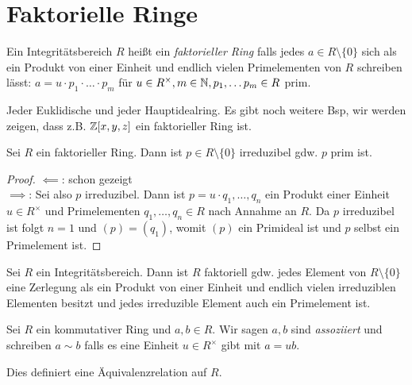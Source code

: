 \section{Faktorielle Ringe}

\begin{definition}
	Ein Integritätsbereich $R$ heißt ein \emph{faktorieller Ring} falls jedes $a \in R \setminus \{0\}$ sich als ein Produkt von einer Einheit
	und endlich vielen Primelementen von $R$ schreiben lässt: $a = u \cdot  p_1 \cdot \ldots \cdot p_{m}$ für $u \in R^{\times}, m \in \mathbb{N}, p_1,\ldots p_{m} \in R$ prim.
\end{definition}

\begin{eg}
	Jeder Euklidische und jeder Hauptidealring.
	Es gibt noch weitere Bsp, wir werden zeigen, dass z.B. $\mathbb{Z}[x,y,z]$ ein faktorieller Ring ist.
\end{eg}

\begin{proposition}
	Sei $R$ ein faktorieller Ring.
	Dann ist $p \in R \setminus \{0\} $ irreduzibel gdw. $p$ prim ist.
\end{proposition}

\begin{proof}
	$\impliedby$: \checkmark schon gezeigt\\
	$\implies$: Sei also $p$ irreduzibel. Dann ist $p = u \cdot  q_1,\ldots,q_{n}$ ein Produkt einer Einheit
	$u \in R^{\times}$ und Primelementen $q_1,\ldots, q_{n} \in R$ nach Annahme an $R$.
	Da $p$ irreduzibel ist folgt $n =1$ und $(p) = (q_1)$, womit $(p)$ ein Primideal ist und $p$ selbst ein Primelement ist.
\end{proof} 

\begin{corollary}
	Sei $R$ ein Integritätsbereich. Dann ist $R$ faktoriell gdw. jedes Element von $R \setminus \{0\} $ eine Zerlegung als ein Produkt
	von einer Einheit und endlich vielen irreduziblen Elementen besitzt und jedes irreduzible Element auch ein Primelement ist.
\end{corollary}

\begin{definition}
	Sei $R$ ein kommutativer Ring und $a,b \in R$.
	Wir sagen $a,b$ sind \emph{assoziiert} und schreiben $a \sim b$ falls es eine Einheit
	$u \in R^{\times}$ gibt mit $a = u b$.
\end{definition}

\begin{lemma}
	Dies definiert eine Äquivalenzrelation auf $R$.
\end{lemma}

